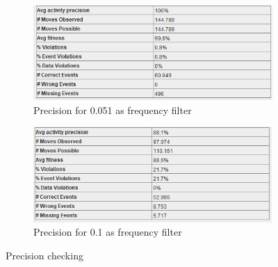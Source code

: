 \begin{figure}[!htbp]
\centering
\begin{subfigure}{.4\textwidth}
  \centering
  \includegraphics[width=\linewidth]{App_Precision0-051.PNG}
  \caption{Precision for 0.051 as frequency filter}
  \label{fig:APP_Prec0-051}
\end{subfigure}%
\begin{subfigure}{.4\textwidth}
  \centering
  \includegraphics[width=\linewidth]{App_Precision0-1.PNG}
  \caption{Precision for 0.1 as frequency filter}
  \label{fig:APP_Prec0-1}
\end{subfigure}
\caption{Precision checking}
\label{fig:App_Prec}
\end{figure}

